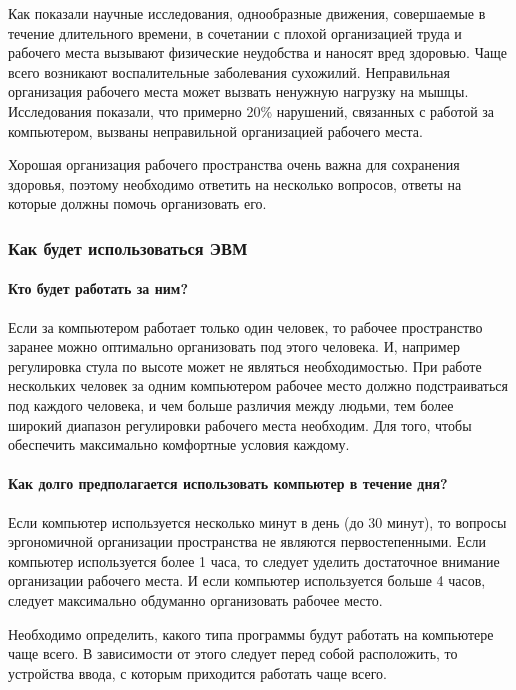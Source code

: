 \documentclass[russian,utf8,emptystyle]{eskdtext}
\begin{document}
\begin{spacing}{1.5}
Как показали научные исследования, однообразные движения, совершаемые в течение длительного времени, в сочетании с плохой организацией труда и рабочего места вызывают физические неудобства и наносят вред здоровью. Чаще всего возникают воспалительные заболевания сухожилий. 
Неправильная организация рабочего места может вызвать ненужную нагрузку на мышцы. Исследования показали, что примерно 20\% нарушений, связанных с работой за компьютером, вызваны неправильной организацией рабочего места. 

Хорошая организация рабочего пространства очень важна для сохранения здоровья, поэтому необходимо ответить на несколько вопросов, ответы на которые должны помочь организовать его.

\subsubsection{Как будет использоваться ЭВМ}

\paragraph{Кто будет работать за ним?}

Если за компьютером работает только один человек, то рабочее пространство заранее можно оптимально организовать под этого человека. И, например регулировка стула по высоте может не являться необходимостью. При работе нескольких человек за одним компьютером рабочее место должно подстраиваться под каждого человека, и чем больше различия между людьми, тем более широкий диапазон регулировки рабочего места необходим. Для того, чтобы обеспечить максимально комфортные условия каждому.

\paragraph{Как долго предполагается использовать компьютер в течение дня?}

Если компьютер используется несколько минут в день (до 30 минут), то вопросы эргономичной организации пространства не являются первостепенными. Если компьютер используется более 1 часа, то следует уделить достаточное внимание организации рабочего места. И если компьютер используется больше 4 часов, следует максимально обдуманно организовать рабочее место. 

Необходимо определить, какого типа программы будут работать на компьютере чаще всего. В зависимости от этого следует перед собой расположить, то устройства ввода, с которым приходится работать чаще всего.


\end{spacing}
\end{document}
